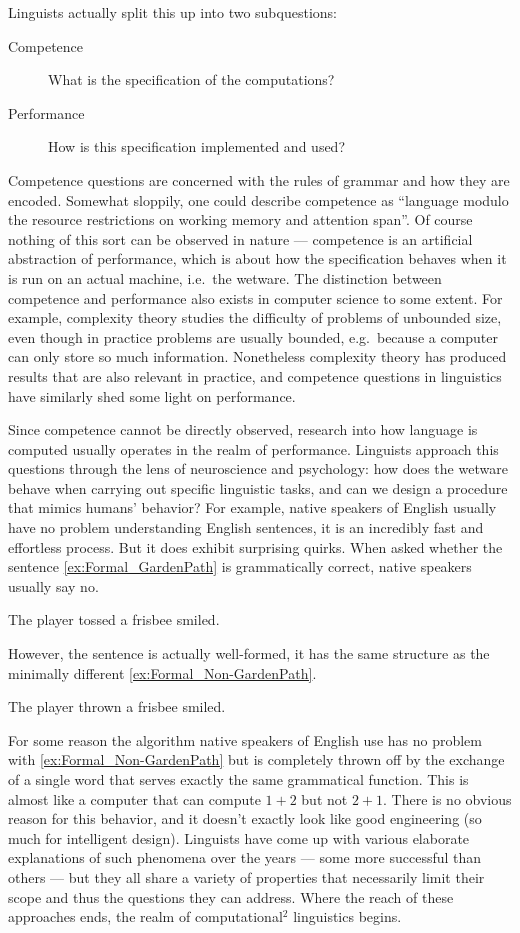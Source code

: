 Linguists actually split this up into two subquestions:
%
\begin{description}
    \item[Competence] What is the specification of the computations?
    \item[Performance] How is this specification implemented and used?
\end{description}
%
Competence questions are concerned with the rules of grammar and how they are encoded.
Somewhat sloppily, one could describe competence as ``language modulo the resource restrictions on working memory and attention span''.
Of course nothing of this sort can be observed in nature --- competence is an artificial abstraction of performance, which is about how the specification behaves when it is run on an actual machine, i.e.\ the wetware.
The distinction between competence and performance also exists in computer science to some extent.
For example, complexity theory studies the difficulty of problems of unbounded size, even though in practice problems are usually bounded, e.g.\ because a computer can only store so much information.
Nonetheless complexity theory has produced results that are also relevant in practice, and competence questions in linguistics have similarly shed some light on performance.

Since competence cannot be directly observed, research into how language is computed usually operates in the realm of performance.
Linguists approach this questions through the lens of neuroscience and psychology: how does the wetware behave when carrying out specific linguistic tasks, and can we design a procedure that mimics humans' behavior?
For example, native speakers of English usually have no problem understanding English sentences, it is an incredibly fast and effortless process.
But it does exhibit surprising quirks.
When asked whether the sentence \eqref{ex:Formal_GardenPath} is grammatically correct, native speakers usually say no.
%
\begin{exe}
        \ex The player tossed a frisbee smiled.\label{ex:Formal_GardenPath}
\end{exe}
%
However, the sentence is actually well-formed, it has the same structure as the minimally different \eqref{ex:Formal_Non-GardenPath}. 
%
\begin{exe}
    \ex The player thrown a frisbee smiled.\label{ex:Formal_Non-GardenPath}
\end{exe}
%
For some reason the algorithm native speakers of English use has no problem with \eqref{ex:Formal_Non-GardenPath} but is completely thrown off by the exchange of a single word that serves exactly the same grammatical function.
This is almost like a computer that can compute $1 + 2$ but not $2 + 1$.
There is no obvious reason for this behavior, and it doesn't exactly look like good engineering (so much for intelligent design).
Linguists have come up with various elaborate explanations of such phenomena over the years --- some more successful than others ---
but they all share a variety of properties that necessarily limit their scope and thus the questions they can address.
Where the reach of these approaches ends, the realm of computational$^2$ linguistics begins.

